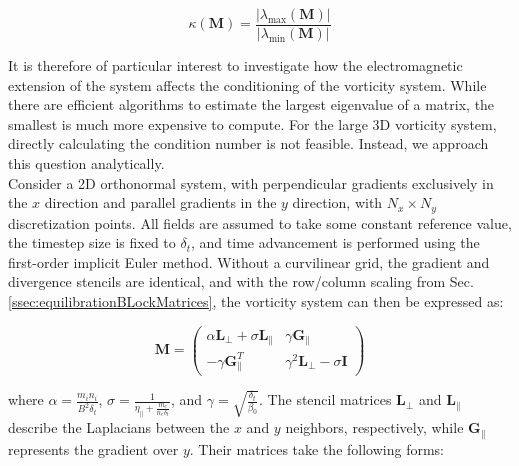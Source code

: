 \begin{equation}
	\kappa\left(\textbf{M}\right) = \frac{\left|\lambda_{\text{max}}(\textbf{M})\right|}{\left|\lambda_{\text{min}}(\textbf{M})\right|}
	\label{eq:Impl_defConditionNumber}
\end{equation}

It is therefore of particular interest to investigate how the electromagnetic extension of the system affects the conditioning of the vorticity system. While there are efficient algorithms to estimate the largest eigenvalue of a matrix, the smallest is much more expensive to compute. For the large 3D vorticity system, directly calculating the condition number is not feasible. Instead, we approach this question analytically. \\

Consider a 2D orthonormal system, with perpendicular gradients exclusively in the $x$ direction and parallel gradients in the $y$ direction, with $N_x \times N_y$ discretization points. All fields are assumed to take some constant reference value, the timestep size is fixed to $\delta_t$, and time advancement is performed using the first-order implicit Euler method. Without a curvilinear grid, the gradient and divergence stencils are identical, and with the row/column scaling from Sec. \ref{ssec:equilibrationBLockMatrices}, the vorticity system can then be expressed as:


\begin{equation}
	\textbf{M} = 
	\begin{pmatrix}
		\alpha \textbf{L}_\perp + \sigma \textbf{L}_\parallel & \gamma \textbf{G}_\parallel \\ -\gamma \textbf{G}_\parallel^T & \gamma^2\textbf{L}_\perp - \sigma \textbf{I} 
	\end{pmatrix}
\end{equation}

where $\alpha = \frac{m_in_i}{B^2\delta_t}$, $\sigma = \frac{1}{\eta_\parallel + \frac{m_e}{n_e \delta_t}}$, and $\gamma = \sqrt{\frac{\delta_t }{\beta_0}}$. The stencil matrices $\textbf{L}_\perp$ and $\textbf{L}_\parallel$ describe the Laplacians between the $x$ and $y$ neighbors, respectively, while $\textbf{G}_\parallel$ represents the gradient over $y$. Their matrices take the following forms:

